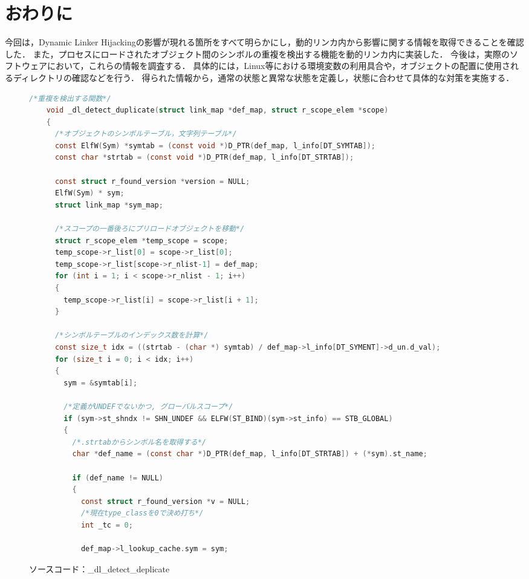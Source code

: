 \documentclass[submit,techreq,noauthor]{eco}	%
\begin{document}
\section{おわりに}
今回は，Dynamic Linker Hijackingの影響が現れる箇所をすべて明らかにし，動的リンカ内から影響に関する情報を取得できることを確認した．
また，プロセスにロードされたオブジェクト間のシンボルの重複を検出する機能を動的リンカ内に実装した．
今後は，実際のソフトウェアにおいて，これらの情報を調査する．
具体的には，Linux等における環境変数の利用具合や，オブジェクトの配置に使用されるディレクトリの確認などを行う．
得られた情報から，通常の状態と異常な状態を定義し，状態に合わせて具体的な対策を実施する．

\begin{figure*}[t]
	\centering
  \caption{ソースコード：\_dl\_detect\_deplicate}
  \begin{lstlisting}[language=c]
    /*重複を検出する関数*/
    void _dl_detect_duplicate(struct link_map *def_map, struct r_scope_elem *scope)
    {
      /*オブジェクトのシンボルテーブル，文字列テーブル*/
      const ElfW(Sym) *symtab = (const void *)D_PTR(def_map, l_info[DT_SYMTAB]);
      const char *strtab = (const void *)D_PTR(def_map, l_info[DT_STRTAB]);

      const struct r_found_version *version = NULL;
      ElfW(Sym) * sym;
      struct link_map *sym_map;

      /*スコープの一番後ろにプリロードオブジェクトを移動*/
      struct r_scope_elem *temp_scope = scope;
      temp_scope->r_list[0] = scope->r_list[0];
      temp_scope->r_list[scope->r_nlist-1] = def_map;
      for (int i = 1; i < scope->r_nlist - 1; i++)
      {
        temp_scope->r_list[i] = scope->r_list[i + 1];
      }

      /*シンボルテーブルのインデックス数を計算*/
      const size_t idx = ((strtab - (char *) symtab) / def_map->l_info[DT_SYMENT]->d_un.d_val);
      for (size_t i = 0; i < idx; i++)
      {
        sym = &symtab[i];

        /*定義がUNDEFでないかつ, グローバルスコープ*/
        if (sym->st_shndx != SHN_UNDEF && ELFW(ST_BIND)(sym->st_info) == STB_GLOBAL)
        {
          /*.strtabからシンボル名を取得する*/
          char *def_name = (const char *)D_PTR(def_map, l_info[DT_STRTAB]) + (*sym).st_name;

          if (def_name != NULL)
          {
            const struct r_found_version *v = NULL;
            /*現在type_classを0で決め打ち*/
            int _tc = 0;

            def_map->l_lookup_cache.sym = sym;


\end{lstlisting}
\end{figure*}
\end{document}
